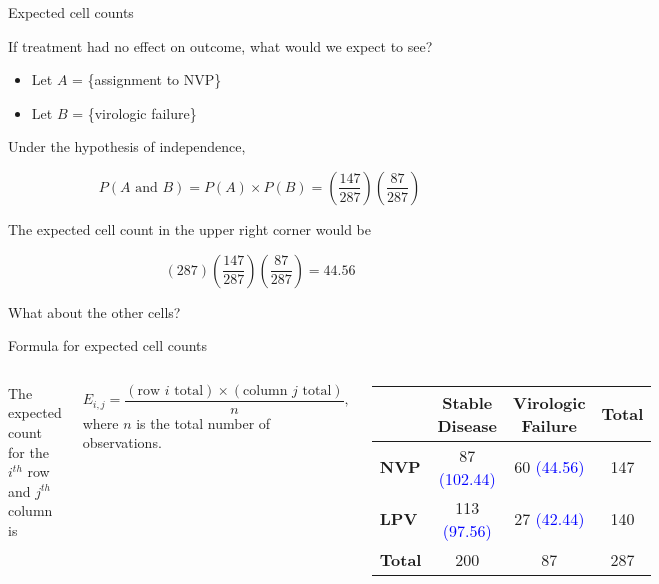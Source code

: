 \documentclass[
  ignorenonframetext,
  aspectratio=169]{beamer}
\newcommand{\columnsbegin}{\begin{columns}}
\newcommand{\columnsend}{\end{columns}}
\begin{document}
\begin{frame}{Expected cell counts}
\protect\hypertarget{expected-cell-counts}{}
\small

If treatment had no effect on outcome, what would we expect to see?

\begin{itemize}
\item
  Let \(A\) = \{assignment to NVP\}
\item
  Let \(B\) = \{virologic failure\}
\end{itemize}

Under the hypothesis of independence,

\[ P(A\text{ and } B) = P(A) \times P(B) = \left(\frac{147}{287}\right) \left(\frac{87}{287}\right)\]

The expected cell count in the upper right corner would be

\[(287) \left(\frac{147}{287}\right) \left(\frac{87}{287}\right) = 44.56\]

What about the other cells?
\end{frame}

\begin{frame}{Formula for expected cell counts}
\protect\hypertarget{formula-for-expected-cell-counts}{}
\columnsbegin


\footnotesize

The expected count for the \(i^{th}\) row and \(j^{th}\) column is

\[E_{i, j} = \dfrac{(\text{row $i$ total}) \times (\text{column $j$ total}) }{n}, \]
where \(n\) is the total number of observations.


\footnotesize

\begin{center}
\begin{tabular}{l|cc|c} 
   & \textbf{Stable Disease} & \textbf{Virologic Failure} & \textbf{Total}\\ \hline
  \textbf{NVP} & 87 \textcolor{blue}{(102.44)} & 60 \textcolor{blue}{(44.56)} & 147  \\
  \textbf{LPV} & 113 \textcolor{blue}{(97.56)} & 27 \textcolor{blue}{(42.44)} & 140 \\ \hline
  \textbf{Total} & 200 & 87 & 287  \\ 
\end{tabular}\\
\end{center}

\columnsend
\end{frame}
\end{document}
